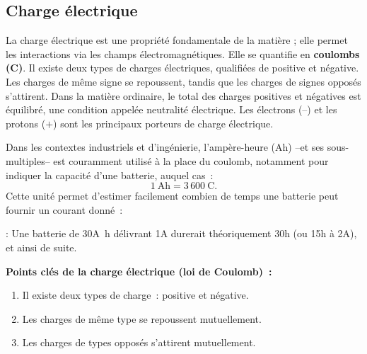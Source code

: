 \subsection{Charge \'electrique}\label{subsec:electric_charge}
La charge \'electrique est une propri\'et\'e fondamentale de la mati\`ere ; elle permet les interactions via les champs \'electromagn\'etiques. Elle se quantifie en \textbf{coulombs (\unit{\coulomb})}. Il existe deux types de charges \'electriques, qualifi\'ees de positive et n\'egative. Les charges de m\^eme signe se repoussent, tandis que les charges de signes oppos\'es s'attirent. Dans la mati\`ere ordinaire, le total des charges positives et n\'egatives est \'equilibr\'e, une condition appel\'ee neutralit\'e \'electrique. Les \'electrons (--) et les protons (\(+\)) sont les principaux porteurs de charge \'electrique.
\begin{figure}[H]
  \centering
\end{figure}
Dans les contextes industriels et d'ing\'enierie, l'amp\`ere-heure (Ah) --et ses sous-multiples-- est couramment utilis\'e à la place du coulomb, notamment pour indiquer la capacit\'e d'une batterie, auquel cas~:
\[
  1~\unit{\ampere\hour} = 3\,600~\unit{\coulomb}.
\]
Cette unit\'e permet d'estimer facilement combien de temps une batterie peut fournir un courant donn\'e~:
\begin{example}:\newline
Une batterie de 30\unit{\ampere\hour}
d\'elivrant 1\unit{\ampere} durerait th\'eoriquement 30\unit{\hour} (ou 15\unit{\hour} à
2\unit{\ampere}), et ainsi de suite.
\end{example}
\begin{Note}
\textbf{Points cl\'es de la charge \'electrique (loi de Coulomb)~:}
\begin{enumerate}
  \item Il existe deux types de charge~: positive et n\'egative.
  \item Les charges de m\^eme type se repoussent mutuellement.
  \item Les charges de types oppos\'es s'attirent mutuellement.
\end{enumerate}
\end{Note}


